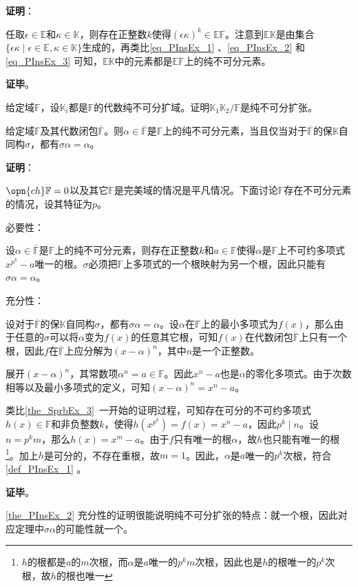 \textbf{证明}：

任取$\epsilon\in\mathbb{E}$和$\kappa\in\mathbb{K}$，则存在正整数$k$使得$(\epsilon\kappa)^k\in\mathbb{EF}$。注意到$\mathbb{EK}$是由集合$\{\epsilon\kappa\mid\epsilon\in\mathbb{E}, \kappa\in\mathbb{K}\}$生成的，再类比\autoref{eq_PInsEx_1} 、\autoref{eq_PInsEx_2} 和\autoref{eq_PInsEx_3} 可知，$\mathbb{EK}$中的元素都是$\mathbb{EF}$上的纯不可分元素。

\textbf{证毕}。


\begin{exercise}{}
给定域$\mathbb{F}$，设$\mathbb{K}_i$都是$\mathbb{F}$的代数纯不可分扩域。证明$\mathbb{K}_1\mathbb{K}_2/\mathbb{F}$是纯不可分扩张。
\end{exercise}

\begin{theorem}{}\label{the_PInsEx_2}
给定域$\mathbb{F}$及其代数闭包$\overline{\mathbb{F}}$。则$\alpha\in\overline{\mathbb{F}}$是$\mathbb{F}$上的纯不可分元素，当且仅当对于$\overline{\mathbb{F}}$的保$\mathbb{K}$自同构$\sigma$，都有$\sigma\alpha=\alpha$。
\end{theorem}

\textbf{证明}：

$\opn{ch}\mathbb{F}=0$以及其它$\mathbb{F}$是完美域的情况是平凡情况。下面讨论$\mathbb{F}$存在不可分元素的情况，设其特征为$p$。

必要性：

设$\alpha\in\overline{\mathbb{F}}$是$\mathbb{F}$上的纯不可分元素，则存在正整数$k$和$a\in\mathbb{F}$使得$\alpha$是$\mathbb{F}$上不可约多项式$x^{p^k}-a$唯一的根。$\sigma$必须把$\mathbb{F}$上多项式的一个根映射为另一个根，因此只能有$\sigma\alpha=\alpha$。







充分性：

设对于$\overline{\mathbb{F}}$的保$\mathbb{K}$自同构$\sigma$，都有$\sigma\alpha=\alpha$。设$\alpha$在$\mathbb{F}$上的最小多项式为$f(x)$，那么由于任意的$\sigma$可以将$\alpha$变为$f(x)$的任意其它根，可知$f(x)$在代数闭包$\overline{\mathbb{F}}$上只有一个根，因此$f$在$\overline{\mathbb{F}}$上应分解为$(x-\alpha)^n$，其中$n$是一个正整数。

展开$(x-\alpha)^n$，其常数项$\alpha^n=a\in\mathbb{F}$。因此$x^n-a$也是$\alpha$的零化多项式。由于次数相等以及最小多项式的定义，可知$(x-\alpha)^n=x^n-a$。

类比\autoref{the_SprbEx_3}~一开始的证明过程，可知存在可分的不可约多项式$h(x)\in\mathbb{F}$和非负整数$k$，使得$h(x^{p^k})=f(x)=x^n-a$，因此$p^k\mid n$。设$n=p^km$，那么$h(x)=x^m-a$。由于$f$只有唯一的根$\alpha$，故$h$也只能有唯一的根\footnote{$h$的根都是$a$的$m$次根，而$\alpha$是$a$唯一的$p^km$次根，因此也是$h$的根唯一的$p^k$次根，故$h$的根也唯一}。加上$h$是可分的，不存在重根，故$m=1$。因此，$\alpha$是$a$唯一的$p^k$次根，符合\autoref{def_PInsEx_1} 。

\textbf{证毕}。

\autoref{the_PInsEx_2} 充分性的证明很能说明纯不可分扩张的特点：就一个根，因此对应定理中$\sigma \alpha$的可能性就一个。








